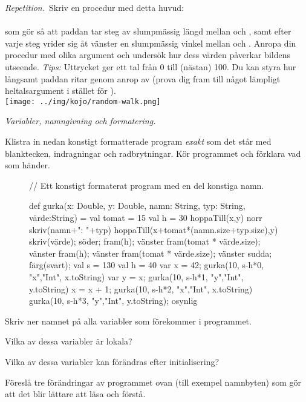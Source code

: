 \Task \emph{Repetition.}~Skriv en procedur  med detta huvud: \\
\\ som gör så att paddan tar  steg av slumpmässig längd mellan  och , samt efter varje steg vrider sig åt vänster en slumpmässig vinkel mellan  och . Anropa din procedur med olika argument och undersök hur dess värden påverkar bildens utseende. \emph{Tips:} Uttrycket  ger ett tal från 0 till (nästan) 100. Du kan styra hur långsamt paddan ritar genom anrop av  (prova dig fram till något  lämpligt heltalsargument i stället för ).
\vspace{2em}\\\texttt{[image: ../img/kojo/random-walk.png]}


\Task \emph{Variabler, namngivning och formatering.}

\Subtask Klistra in nedan konstigt formatterade program \emph{exakt} som det står med blanktecken, indragningar och radbrytningar. Kör programmet och förklara vad som händer.

\begin{figure}[H]
\begin{Code}
// Ett konstigt formaterat program med en del konstiga namn.

def gurka(x: Double,
y: Double, namn: String,
typ: String,
värde:String) = {
val tomat = 15
val h = 30
hoppaTill(x,y)
norr
skriv(namn+": "+typ)
hoppaTill(x+tomat*(namn.size+typ.size),y)
skriv(värde); söder; fram(h); vänster
fram(tomat * värde.size); vänster
fram(h); vänster
fram(tomat * värde.size); vänster }
sudda; färg(svart); val s = 130
val h = 40
var x = 42; gurka(10, s-h*0, "x","Int", x.toString)
var y = x; gurka(10, s-h*1, "y","Int", y.toString)
x = x + 1; gurka(10, s-h*2, "x","Int", x.toString)
gurka(10, s-h*3, "y","Int", y.toString); osynlig
\end{Code}
\end{figure}

\Subtask\Pen Skriv ner namnet på alla variabler som förekommer i programmet.

\Subtask\Pen Vilka av dessa variabler är lokala?

\Subtask\Pen Vilka av dessa variabler kan förändras efter initialisering?

\Subtask\Pen Föreslå tre förändringar av programmet ovan (till exempel namnbyten) som gör att det blir lättare att läsa och förstå.

